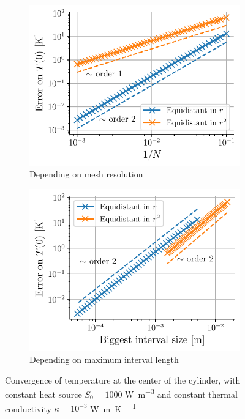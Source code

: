 \begin{figure}[h]
    \centering
    \begin{subfigure}{0.48\linewidth}
        \centering
        \includegraphics[width=\linewidth]{figures/convergence_temp_N_constant.pdf}
        \caption{Depending on mesh resolution}
        \label{fig:convergence_temp_N_constant}
    \end{subfigure}
    \begin{subfigure}{0.48\linewidth}
        \centering
        \includegraphics[width=\linewidth]{figures/convergence_temp_interval_constant.pdf}
        \caption{Depending on maximum interval length}
        \label{fig:convergence_temp_interval_constant}
    \end{subfigure}
    \caption{Convergence of temperature at the center of the cylinder, with constant heat source \(S_0 = 1000\) \si{\watt\per\meter\cubed} and constant thermal conductivity \(\kappa = 10^{-3}\) \si{\watt\per\meter\per\kelvin}}
    \label{fig:convergence_temp_constant}
\end{figure}

